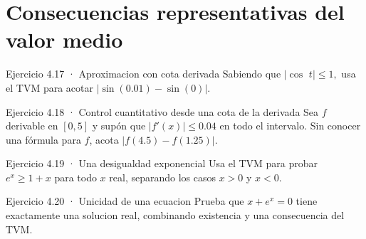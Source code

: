 \documentclass[10pt,a4paper,oneside,openany]{book}
\begin{document}
\section{Consecuencias representativas del valor medio}
\begin{PSevenExerciseFixed}{Ejercicio 4.17 · Aproximacion con cota derivada}
Sabiendo que \(|\cos\) \(t|\le 1,\) usa el TVM para acotar \(|\sin(0.01)-\sin(0)|\).
\end{PSevenExerciseFixed}
\begin{PSevenExerciseFixed}{Ejercicio 4.18 · Control cuantitativo desde una cota de la derivada}
Sea \(f\) derivable en \([0,5]\) y supón que \(|f'(x)|\le0.04\) en todo el intervalo. Sin conocer una fórmula para \(f\), acota \(|f(4.5)-f(1.25)|\).
\end{PSevenExerciseFixed}
\begin{PSevenExerciseFixed}{Ejercicio 4.19 · Una desigualdad exponencial}
Usa el TVM para probar \(e^x\ge 1+x\) para todo \(x\) real, separando los casos \(x>0\) y \(x<0\).
\end{PSevenExerciseFixed}
\begin{PSevenExerciseFixed}{Ejercicio 4.20 · Unicidad de una ecuacion}
Prueba que \(x+e^x=0\) tiene exactamente una solucion real, combinando existencia y una consecuencia del TVM.
\end{PSevenExerciseFixed}
\end{document}

